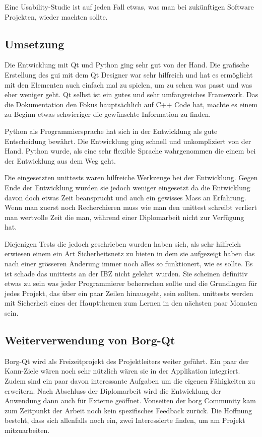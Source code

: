 Eine Usability-Studie ist auf jeden Fall etwas, was man bei
zukünftigen Software Projekten, wieder machten sollte.

\subsection{Umsetzung}
\label{sec:org52897fb}

Die Entwicklung mit Qt und Python ging sehr gut von der Hand. Die grafische
Erstellung des \gls{gui} mit dem Qt Designer war sehr hilfreich und hat es
ermöglicht mit den Elementen auch einfach mal zu spielen, um zu sehen was passt
und was eher weniger geht. Qt selbst ist ein gutes und sehr umfangreiches
Framework. Das die Dokumentation den Fokus hauptsächlich auf C++ Code hat,
machte es einem zu Beginn etwas schwieriger die gewünschte Information zu
finden.

Python als Programmiersprache hat sich in der Entwicklung als gute Entscheidung
bewährt. Die Entwicklung ging schnell und unkompliziert von der Hand. Python
wurde, als eine sehr flexible Sprache wahrgenommen die einem bei der Entwicklung
aus dem Weg geht.

Die eingesetzten \glspl{unittest} waren hilfreiche Werkzeuge bei der Entwicklung.
Gegen Ende der Entwicklung wurden sie jedoch weniger eingesetzt da die
Entwicklung davon doch etwas Zeit beansprucht und auch ein gewisses Mass an
Erfahrung. Wenn man zuerst noch Recherchieren muss wie man den \gls{unittest}
schreibt verliert man wertvolle Zeit die man, während einer Diplomarbeit nicht
zur Verfügung hat.

Diejenigen Tests die jedoch geschrieben wurden haben sich, als sehr hilfreich
erwiesen einem ein Art Sicherheitsnetz zu bieten in dem sie aufgezeigt haben
das nach einer grösseren Änderung immer noch alles so funktionert, wie es
sollte. Es ist schade das \glspl{unittest} an der IBZ nicht gelehrt wurden. Sie
scheinen definitiv etwas zu sein was jeder Programmierer beherrschen sollte und
die Grundlagen für jedes Projekt, das über ein paar Zeilen hinausgeht, sein
sollten. \glspl{unittest} werden mit Sicherheit eines der Hauptthemen zum Lernen in
den nächsten paar Monaten sein.

\subsection{Weiterverwendung von Borg-Qt}
\label{sec:orge5ea08e}

Borg-Qt wird als Freizeitprojekt des Projektleiters weiter geführt. Ein paar
der Kann-Ziele wären noch sehr nützlich wären sie in der Applikation
integriert. Zudem sind ein paar davon interessante Aufgaben um die eigenen
Fähigkeiten zu erweitern. Nach Abschluss der Diplomarbeit wird die Entwicklung
der Anwendung dann auch für Externe geöffnet. Vonseiten der \gls{borg} Community
kam zum Zeitpunkt der Arbeit noch kein spezifisches Feedback zurück. Die
Hoffnung besteht, dass sich allenfalls noch ein, zwei Interessierte finden, um
am Projekt mitzuarbeiten.

